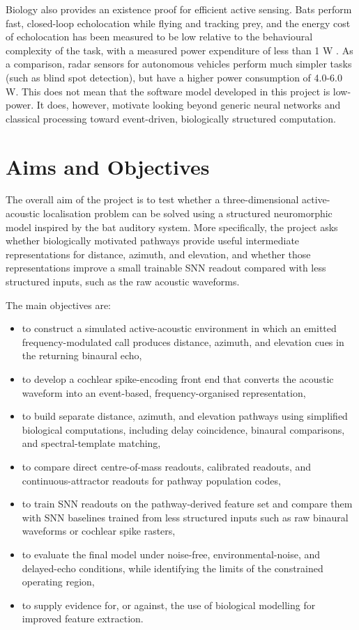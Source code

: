 Biology also provides an existence proof for efficient active sensing. Bats perform fast, closed-loop echolocation while flying and tracking prey, and the energy cost of echolocation has been measured to be low relative to the behavioural complexity of the task, with a measured power expenditure of less than 1 W \cite{Speakman1989ThePipistrellus}. As a comparison, radar sensors for autonomous vehicles perform much simpler tasks (such as blind spot detection), but have a higher power consumption of 4.0-6.0 W\cite{Rajashekara2024DataReview}. This does not mean that the software model developed in this project is low-power. It does, however, motivate looking beyond generic neural networks and classical processing toward event-driven, biologically structured computation.

\section{Aims and Objectives}

The overall aim of the project is to test whether a three-dimensional active-acoustic localisation problem can be solved using a structured neuromorphic model inspired by the bat auditory system. More specifically, the project asks whether biologically motivated pathways provide useful intermediate representations for distance, azimuth, and elevation, and whether those representations improve a small trainable SNN readout compared with less structured inputs, such as the raw acoustic waveforms.

The main objectives are:
\begin{itemize}
    \item to construct a simulated active-acoustic environment in which an emitted frequency-modulated call produces distance, azimuth, and elevation cues in the returning binaural echo,
    \item to develop a cochlear spike-encoding front end that converts the acoustic waveform into an event-based, frequency-organised representation,
    \item to build separate distance, azimuth, and elevation pathways using simplified biological computations, including delay coincidence, binaural comparisons, and spectral-template matching,
    \item to compare direct centre-of-mass readouts, calibrated readouts, and continuous-attractor readouts for pathway population codes,
    \item to train SNN readouts on the pathway-derived feature set and compare them with SNN baselines trained from less structured inputs such as raw binaural waveforms or cochlear spike rasters,
    \item to evaluate the final model under noise-free, environmental-noise, and delayed-echo conditions, while identifying the limits of the constrained operating region,
    \item to supply evidence for, or against, the use of biological modelling for improved feature extraction.
\end{itemize}

